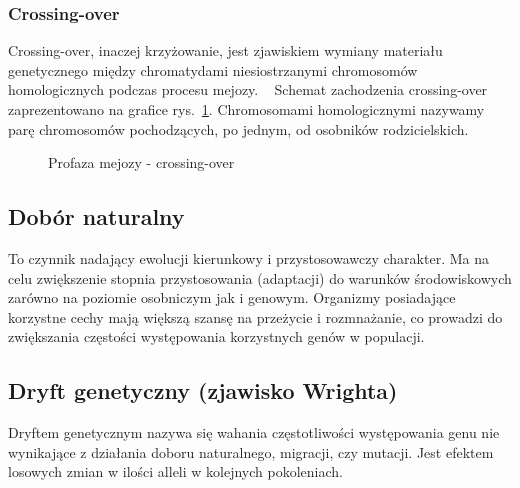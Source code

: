 \documentclass[twoside,a4paper,10]{book}
\begin{document}
           \subsubsection{ Crossing-over} 
Crossing-over, inaczej krzyżowanie,  jest zjawiskiem wymiany materiału genetycznego między chromatydami 
niesiostrzanymi chromosomów homologicznych podczas procesu mejozy. ~\cite{bioDicWeb} Schemat zachodzenia crossing-over zaprezentowano na grafice rys.~\ref{fig:crossingover}. Chromosomami homologicznymi nazywamy parę chromosomów pochodzących, po jednym, od osobników rodzicielskich. 
\begin{figure}[!h]
		\centering
		\caption{Profaza mejozy - crossing-over}
		\label{fig:crossingover}
\end{figure}

\subsection{Dobór naturalny}
    To czynnik nadający ewolucji kierunkowy i przystosowawczy charakter. Ma na celu zwiększenie stopnia przystosowania (adaptacji) do warunków środowiskowych 
zarówno na poziomie osobniczym jak i genowym.
 Organizmy posiadające korzystne cechy mają większą szansę na przeżycie 
i rozmnażanie, co prowadzi do zwiększania częstości występowania korzystnych genów 
w populacji.
\subsection{ Dryft genetyczny (zjawisko Wrighta) }
    Dryftem genetycznym nazywa się wahania częstotliwości występowania genu 
nie wynikające z działania doboru naturalnego, migracji, czy mutacji. Jest efektem losowych zmian w ilości alleli w kolejnych pokoleniach. ~\cite{encykBio}
\end{document}
